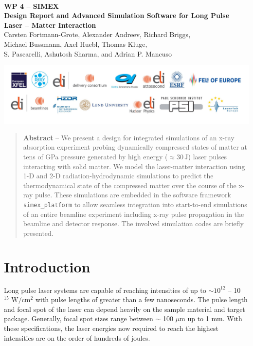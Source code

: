 \documentclass[12pt]{scrartcl}
\begin{document}
\makeatletter
\begin{titlepage}
\thispagestyle{scrheadings}
\begin{center}
$~$\\
\vspace{2cm}
\Huge{\textbf{WP 4 -- SIMEX\\[1cm]
Design Report and Advanced Simulation Software for Long Pulse Laser -- Matter Interaction}}\\[5mm]
\vspace{2cm}
\large{
Carsten Fortmann-Grote, Alexander Andreev, Richard Briggs,\\ Michael Bussmann,
  Axel Huebl, Thomas Kluge,\\
 S. Pascarelli, Ashutosh Sharma, and Adrian P. Mancuso\\
 }
\vspace{1cm}
\@date
\end{center}
\vfill%
\includegraphics[width=\textwidth]{./PartnerLogos.pdf}
\normalfont
\end{titlepage}
\makeatother

\tableofcontents

\begin{abstract}
  \noindent%
  \textbf{Abstract} -- We present a design for integrated simulations of an x-ray absorption
  experiment probing dynamically compressed states of matter at tens of GPa pressure generated by
  high energy ($\approx 30\,\text{J}$) laser pulses interacting with solid matter.
  We model the laser-matter interaction using 1-D and 2-D radiation-hydrodynamic simulations to predict
  the thermodynamical state of the compressed matter over the course of the x-ray pulse. These simulations
  are embedded in the software framework \texttt{simex\_platform} to allow seamless integration into
  start-to-end simulations of an entire beamline experiment including x-ray pulse propagation in the beamline and
  detector response. The involved simulation codes are briefly presented.
\end{abstract}
%
\section{Introduction}
Long pulse laser systems are capable of reaching intensities of up to $\sim 10^{12}$ -- 10$^{15} \text{ W}/\text{cm}^2$ with pulse lengths of
greater than a few nanoseconds. The pulse length and focal spot of the laser can depend heavily on the sample material and target package.
Generally, focal spot sizes range between $\sim$ 100 $\mu$m up to 1 mm. With these specifications, the laser energies now required to reach the
highest intensities are on the order of hundreds of joules.
\end{document}
